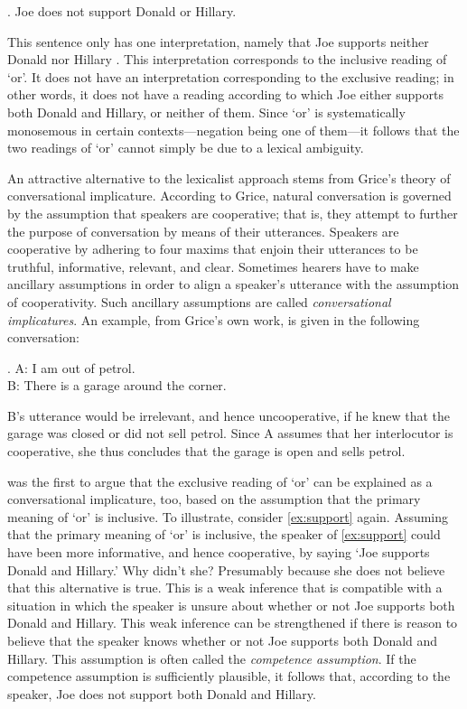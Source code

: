 \documentclass[12pt]{article}
\begin{document}
\ex.	 Joe does not support Donald or Hillary.

This sentence only has one interpretation, namely that Joe supports neither Donald nor Hillary \citep[cf.][]{crain2008}. This interpretation corresponds to the inclusive reading of `or'. It does not have an interpretation corresponding to the exclusive reading; in other words, it does not have a reading according to which Joe either supports both Donald and Hillary, or neither of them. Since `or' is systematically monosemous in certain contexts---negation being one of them---it follows that the two readings of `or' cannot simply be due to a lexical ambiguity.

An attractive alternative to the lexicalist approach stems from Grice's \citeyearpar{grice1975} theory of conversational implicature. According to Grice, natural conversation is governed by the assumption that speakers are cooperative; that is, they attempt to further the purpose of conversation by means of their utterances. Speakers are cooperative by adhering to four maxims that enjoin their utterances to be truthful, informative, relevant, and clear. Sometimes hearers have to make ancillary assumptions in order to align a speaker's utterance with the assumption of cooperativity. Such ancillary assumptions are called \emph{conversational implicatures}. An example, from Grice's own work, is given in the following conversation:

\ex.	A: I am out of petrol. \\
 B: There is a garage around the corner.
	
B's utterance would be irrelevant, and hence uncooperative, if he knew that the garage was closed or did not sell petrol. Since A assumes that her interlocutor is cooperative, she thus concludes that the garage is open and sells petrol.

\citet{horn1972} was the first to argue that the exclusive reading of `or' can be explained as
a conversational implicature, too, based on the assumption that the primary meaning of `or' is
inclusive. To illustrate, consider \ref{ex:support} again. Assuming that the primary meaning of
`or' is inclusive, the speaker of \ref{ex:support} could have been more informative, and hence
cooperative, by saying `Joe supports Donald and Hillary.' Why didn't she? Presumably because
she does not believe that this alternative is true. This is a weak inference that is compatible
with a situation in which the speaker is unsure about whether or not Joe supports both Donald
and Hillary. This weak inference can be strengthened if there is reason to believe that the speaker knows whether or not Joe supports both Donald and Hillary. This assumption is often called the \emph{competence assumption}. If the competence assumption is sufficiently plausible, it follows that, according to the speaker, Joe does not support both Donald and Hillary.
\end{document}
